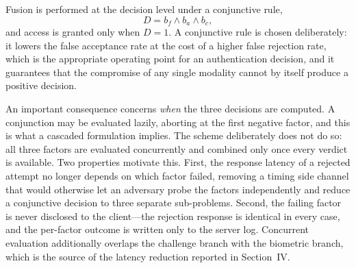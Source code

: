 \documentclass[10pt,journal,compsoc]{IEEEtran}
\begin{document}
{Fusion is performed at the decision level under a conjunctive rule,
\begin{equation}
D = b_f \wedge b_a \wedge b_c ,
\label{eq:fusion}
\end{equation}
and access is granted only when $D = 1$. A conjunctive rule is chosen deliberately: it lowers the false acceptance rate at the cost of a higher false rejection rate, which is the appropriate operating point for an authentication decision, and it guarantees that the compromise of any single modality cannot by itself produce a positive decision.

An important consequence concerns \emph{when} the three decisions are computed. A conjunction may be evaluated lazily, aborting at the first negative factor, and this is what a cascaded formulation implies. The scheme deliberately does not do so: all three factors are evaluated concurrently and combined only once every verdict is available. Two properties motivate this. First, the response latency of a rejected attempt no longer depends on which factor failed, removing a timing side channel that would otherwise let an adversary probe the factors independently and reduce a conjunctive decision to three separate sub-problems. Second, the failing factor is never disclosed to the client---the rejection response is identical in every case, and the per-factor outcome is written only to the server log. Concurrent evaluation additionally overlaps the challenge branch with the biometric branch, which is the source of the latency reduction reported in Section~IV.

}
\end{document}

